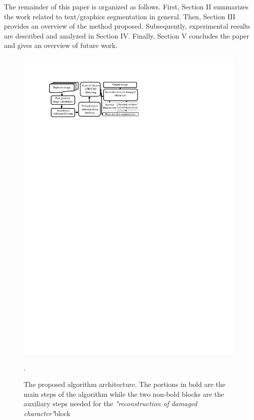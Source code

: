 \documentclass[runningheads]{llncs}
\begin{document}
The remainder of this paper is organized as follows. First, Section II summarizes the work related to text/graphics
segmentation in general. Then, Section III provides an overview of the method proposed. Subsequently, experimental results are described and analyzed in Section IV. Finally, Section V concludes the paper and gives an overview of future work.
\begin{figure}[h!]	       
	\centering
	\includegraphics[trim = 2.4cm 23.6cm 9.5cm 2.3cm, clip,  scale = 0.95]{./images/schema}
	\caption{The proposed algorithm architecture. The portions in bold are the main steps of the algorithm while the two non-bold blocks are the auxiliary steps needed for the \textit{"reconstruction of damaged character"}block}.  
	\label{fig:architecture}
\end{figure}
\end{document}
